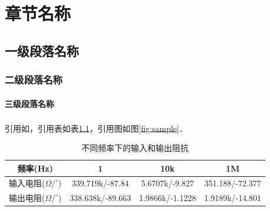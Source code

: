 \documentclass[UTF8,openany,AutoFakeBold,AutoFakeSlant,cs4size]{ctexbook}
\newcommand{\upcite}[1]{\textsuperscript{\cite{#1}}} %
\begin{document}
{
	\fancyhf{}
	\fancyfoot[CO,CE]{~\thepage~}
	\renewcommand{\headrulewidth}{0.7pt}
	\renewcommand{\footrulewidth}{0pt}
}
\fancyhf{}
\fancyfoot[CO,CE]{~\thepage~}
\renewcommand{\headrulewidth}{0.7pt}
\renewcommand{\footrulewidth}{0pt}
\renewcommand{\contentsname}{\centerline{全文目录}}
\tableofcontents
{}
\clearpage





\normalsize
\linespread{1.5}\selectfont
{
	\fancyhf{}
	\fancyhead[RE,RO]{\leftmark}
	\fancyfoot[CO,CE]{~\thepage~}
	\renewcommand{\headrulewidth}{0.7pt}
	\renewcommand{\footrulewidth}{0pt}
}
\fancyhf{}
\fancyhead[RE,RO]{\leftmark}
\fancyfoot[CO,CE]{~\thepage~}
\renewcommand{\headrulewidth}{0.7pt}
\renewcommand{\footrulewidth}{0pt}



\chapter{章节名称}
\section{一级段落名称}
\subsection{二级段落名称}
\subsubsection{三级段落名称}
引用如\upcite{PhysRev.47.777}，引用表如表\ref{tab:input_output_r}，引用图如图\ref{fig:sample}．

\begin{table}[h]
\small %
\centering
\caption{不同频率下的输入和输出阻抗}
\label{tab:input_output_r}
\begin{tabular}{cccc} %
\toprule %
频率(Hz) & 1 & 10k & 1M \\
\midrule
输入电阻($\Omega/^\circ$) & 339.719k/-87.84 & 5.6707k/-9.827 & 351.188/-72.377\\
输出电阻($\Omega/^\circ$) & 338.638k/-89.663 & 1.9866k/-1.1228 & 1.9189k/-14.801 \\
\bottomrule
\end{tabular}
\end{table}
\end{document}

